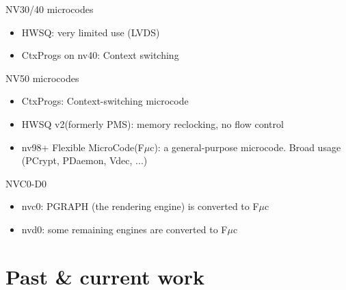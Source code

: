 \documentclass[11pt,english,compress]{beamer}
\begin{document}
		\begin{frame}
			\begin{block}{NV30/40 microcodes}
				\begin{itemize}
					\item HWSQ: very limited use (LVDS)
					\item CtxProgs on nv40: Context switching
				\end{itemize}
			\end{block}

			\begin{block}{NV50 microcodes}
				\begin{itemize}
					\item CtxProgs: Context-switching microcode
					\item HWSQ v2(formerly PMS): memory reclocking, no flow control
					\item nv98+ Flexible MicroCode(F$\mu$c): a general-purpose microcode. Broad usage (PCrypt, PDaemon, Vdec, ...)
				\end{itemize}
			\end{block}

			\begin{block}{NVC0-D0}
				\begin{itemize}
					\item nvc0: PGRAPH (the rendering engine) is converted to F$\mu$c
					\item nvd0: some remaining engines are converted to F$\mu$c
				\end{itemize}
			\end{block}
		\end{frame}

\section{Past \& current work}
\end{document}
